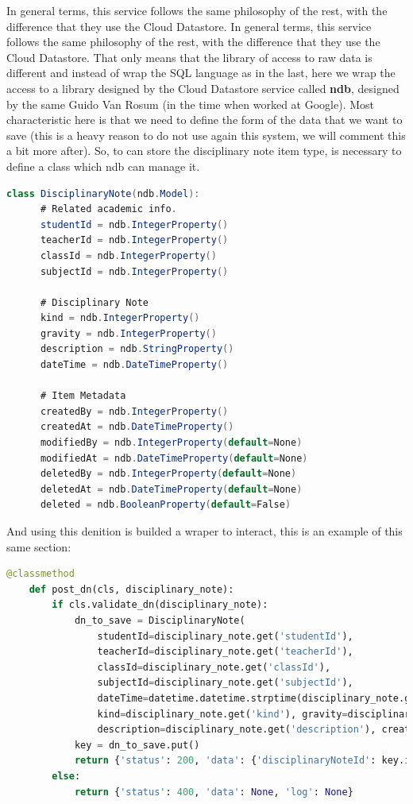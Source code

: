In general terms, this service follows the same philosophy of the rest, with the
difference that they use the Cloud Datastore. In general terms, this service follows
the same philosophy of the rest, with the difference that they use the Cloud Datastore.
That only means that the library of access to raw data is different and instead of
wrap the SQL language as in the last, here we wrap the access to a library designed
by the Cloud Datastore service called \textbf{ndb}, designed by the same Guido Van
Rosum (in the time when worked at Google).
\intro
Most characteristic here is that we need to define the form of the data that we
want to save (this is a heavy reason to do not use again this system, we will
comment this a bit more after).
So, to can store the disciplinary note item type, is necessary to define a
class which ndb can manage it.
\begin{lstlisting}[language=java,frame=none]
  class DisciplinaryNote(ndb.Model):
      # Related academic info.
      studentId = ndb.IntegerProperty()
      teacherId = ndb.IntegerProperty()
      classId = ndb.IntegerProperty()
      subjectId = ndb.IntegerProperty()

      # Disciplinary Note
      kind = ndb.IntegerProperty()
      gravity = ndb.IntegerProperty()
      description = ndb.StringProperty()
      dateTime = ndb.DateTimeProperty()

      # Item Metadata
      createdBy = ndb.IntegerProperty()
      createdAt = ndb.DateTimeProperty()
      modifiedBy = ndb.IntegerProperty(default=None)
      modifiedAt = ndb.DateTimeProperty(default=None)
      deletedBy = ndb.IntegerProperty(default=None)
      deletedAt = ndb.DateTimeProperty(default=None)
      deleted = ndb.BooleanProperty(default=False)
\end{lstlisting}

\noindent And using this denition is builded a wraper to interact, this is
an example of this same section:

\begin{lstlisting}[language=python, frame=none]
  @classmethod
    def post_dn(cls, disciplinary_note):
        if cls.validate_dn(disciplinary_note):
            dn_to_save = DisciplinaryNote(
                studentId=disciplinary_note.get('studentId'),
                teacherId=disciplinary_note.get('teacherId'),
                classId=disciplinary_note.get('classId'),
                subjectId=disciplinary_note.get('subjectId'),
                dateTime=datetime.datetime.strptime(disciplinary_note.get('dateTime'),"%Y-%m-%d %H:%M"),
                kind=disciplinary_note.get('kind'), gravity=disciplinary_note.get('gravity'),
                description=disciplinary_note.get('description'), createdBy=1, createdAt=time_now())
            key = dn_to_save.put()
            return {'status': 200, 'data': {'disciplinaryNoteId': key.id()}}
        else:
            return {'status': 400, 'data': None, 'log': None}
\end{lstlisting}

